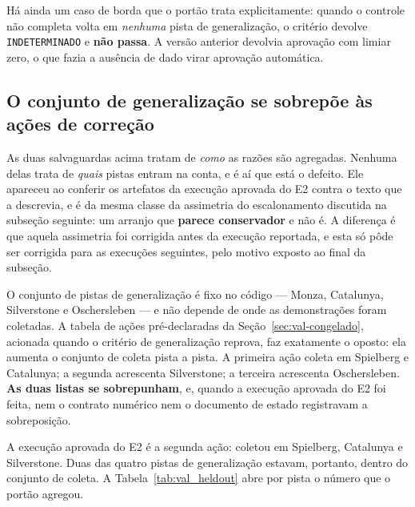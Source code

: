 Há ainda um caso de borda que o portão trata explicitamente: quando o controle
não completa volta em \textit{nenhuma} pista de generalização, o critério devolve
\texttt{INDETERMINADO} e \textbf{não passa}. A versão anterior devolvia aprovação
com limiar zero, o que fazia a ausência de dado virar aprovação automática.

\subsection{O conjunto de generalização se sobrepõe às ações de correção}
\label{sec:val-heldout}

As duas salvaguardas acima tratam de \textit{como} as razões são agregadas.
Nenhuma delas trata de \textit{quais} pistas entram na conta, e é aí que está o
defeito. Ele apareceu ao conferir os artefatos da execução aprovada do E2 contra
o texto que a descrevia, e é da mesma classe da assimetria do escalonamento
discutida na subseção seguinte: um arranjo que \textbf{parece conservador} e não
é. A diferença é que aquela assimetria foi corrigida antes da execução
reportada, e esta só pôde ser corrigida para as execuções seguintes, pelo motivo
exposto ao final da subseção.

O conjunto de pistas de generalização é fixo no código --- Monza, Catalunya,
Silverstone e Oschersleben --- e não depende de onde as demonstrações foram
coletadas. A tabela de ações pré-declaradas da Seção~\ref{sec:val-congelado},
acionada quando o critério de generalização reprova, faz exatamente o oposto:
ela aumenta o conjunto de coleta pista a pista. A primeira ação coleta em
Spielberg e Catalunya; a segunda acrescenta Silverstone; a terceira acrescenta
Oschersleben. \textbf{As duas listas se sobrepunham}, e, quando a execução
aprovada do E2 foi feita, nem o contrato numérico nem o documento de estado
registravam a sobreposição.

A execução aprovada do E2 é a segunda ação: coletou em Spielberg, Catalunya e
Silverstone. Duas das quatro pistas de generalização estavam, portanto, dentro do
conjunto de coleta. A Tabela~\ref{tab:val_heldout} abre por pista o número que o
portão agregou.

